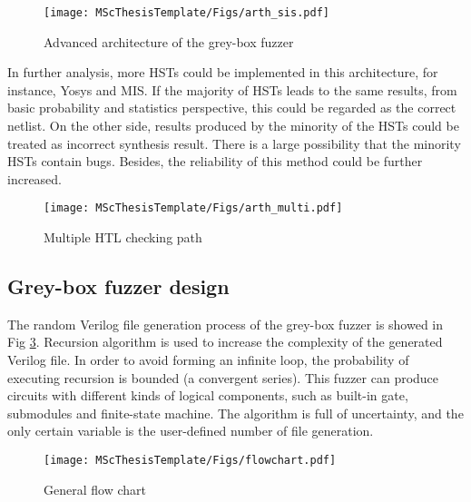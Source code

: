 \begin{figure}[htbp]
    \centering
    \texttt{[image: MScThesisTemplate/Figs/arth\_sis.pdf]}
    \caption{\footnotesize Advanced architecture of the grey-box fuzzer}
    \label{fig:arch_sis}
\end{figure}

In further analysis, more HSTs could be implemented in this architecture, for instance, Yosys and MIS. If the majority of HSTs leads to the same results, from basic probability and statistics perspective, this could be regarded as the correct netlist. On the other side,  results produced by the minority of the HSTs could be treated as incorrect synthesis result. There is a large possibility that the minority HSTs contain bugs. Besides, the reliability of this method could be further increased.
\begin{figure}[htbp]
    \centering
    \texttt{[image: MScThesisTemplate/Figs/arth\_multi.pdf]}
    \caption{\footnotesize Multiple HTL checking path}
    \label{fig:arch_multi}
\end{figure}


\subsection{Grey-box fuzzer design}
The random Verilog file generation process of the grey-box fuzzer is showed in Fig \ref{fig:flowchart}. Recursion algorithm is used to increase the complexity of the generated Verilog file. In order to avoid forming an infinite loop, the probability of executing recursion is bounded (a convergent series). This fuzzer can produce circuits with different kinds of logical components, such as built-in gate, submodules and finite-state machine. The algorithm is full of uncertainty, and the only certain variable is the user-defined number of file generation.
\begin{figure}[htb]
    \centering
    \texttt{[image: MScThesisTemplate/Figs/flowchart.pdf]}
    \caption{\footnotesize General flow chart}
    \label{fig:flowchart}
\end{figure}

